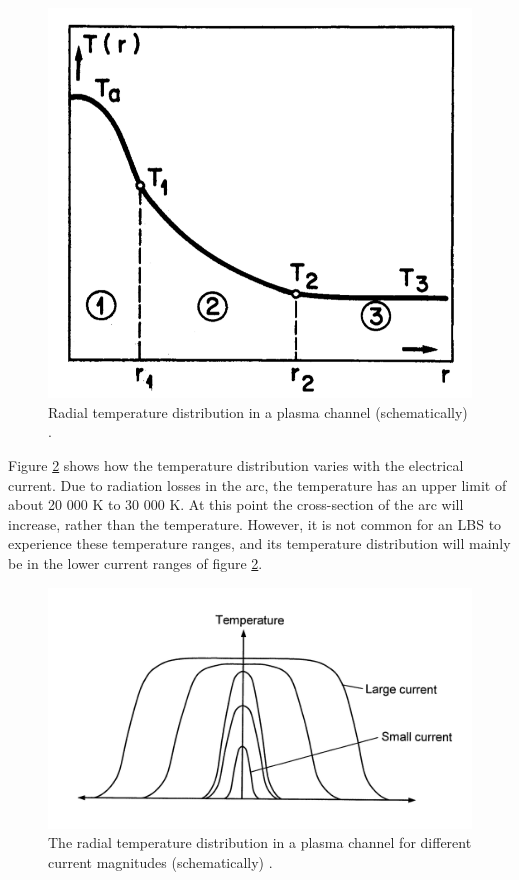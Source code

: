 \documentclass[10pt,b5paper,twoside]{article}
\begin{document}
\begin{figure}[H]
\centering
\includegraphics[scale=0.25]{Bilder/Theory/tempZonesArc.png}
\caption{Radial temperature distribution in a plasma channel (schematically) \cite{bib:TDCIGBB}.} \label{fig:tempDist1}
\end{figure}

Figure \ref{fig:tempDist2} shows how the temperature distribution varies with the electrical current. Due to radiation losses in the arc, the temperature has an upper limit of about 20 000 K to 30 000 K. At this point the cross-section of the arc will increase, rather than the temperature. However, it is not common for an LBS to experience these temperature ranges, and its temperature distribution will mainly be in the lower current ranges of figure \ref{fig:tempDist2}.

\begin{figure}[H]
\centering
\includegraphics[scale=0.85]{Bilder/Theory/plasmaChannel1.png}
\caption{The radial temperature distribution in a plasma channel for different current magnitudes (schematically) \cite{bib:HVEbreak}.} \label{fig:tempDist2}
\end{figure}
\end{document}
